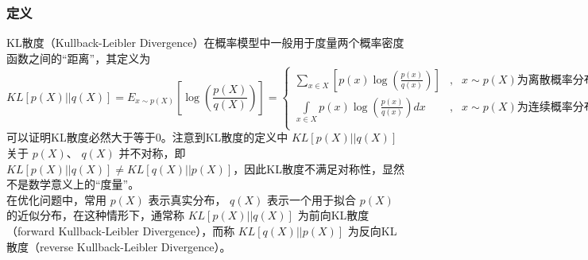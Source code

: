 \documentclass[12pt,a4paper,UTF8]{article}
\begin{document}
\subsubsection{定义}
\indent KL散度（Kullback-Leibler Divergence）在概率模型中一般用于度量两个概率密度函数之间的“距离”，其定义为
\[KL\left[p\left(X\right)||q\left(X\right)\right]=E_{x\sim p\left(X\right)}\left[\log\left(\frac{p\left(X\right)}{q\left(X\right)}\right)\right]=\left\{
\begin{matrix}
\sum\limits_{x\in X}\left[p\left(x\right)\log\left(\frac{p\left(x\right)}{q\left(x\right)}\right)\right]&,&x\sim p\left(X\right)\text{为离散概率分布}\\
\int\limits_{x\in X}p\left(x\right)\log\left(\frac{p\left(x\right)}{q\left(x\right)}\right)dx&,&x\sim p\left(X\right)\text{为连续概率分布}\\
\end{matrix}
\right.\]
可以证明KL散度必然大于等于0。注意到KL散度的定义中 $KL\left[p\left(X\right)||q\left(X\right)\right]$ 关于 $p\left(X\right)$、 $q\left(X\right)$ 并不对称，即 $KL\left[p\left(X\right)||q\left(X\right)\right]\neq KL\left[q\left(X\right)||p\left(X\right)\right]$，因此KL散度不满足对称性，显然不是数学意义上的“度量”。\\
\indent 在优化问题中，常用 $p\left(X\right)$ 表示真实分布， $q\left(X\right)$ 表示一个用于拟合 $p\left(X\right)$ 的近似分布，在这种情形下，通常称 $KL\left[p\left(X\right)||q\left(X\right)\right]$ 为前向KL散度（forward Kullback-Leibler Divergence），而称 $KL\left[q\left(X\right)||p\left(X\right)\right]$ 为反向KL散度（reverse Kullback-Leibler Divergence）。
\end{document}
